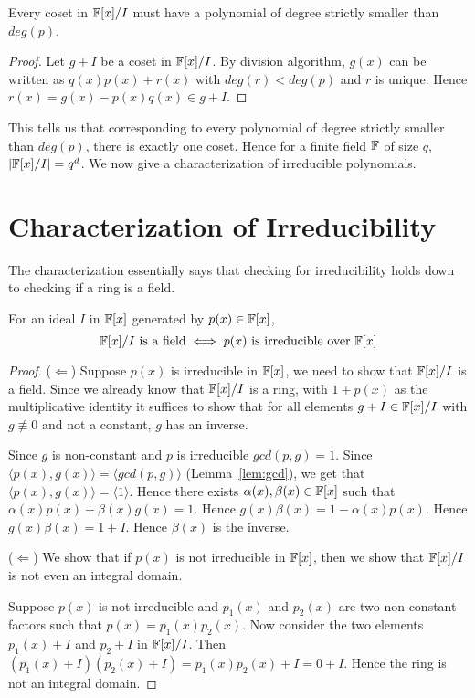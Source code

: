 \begin{observation}
	Every coset in ${\mathbb{F}}[x]/I$ must have a polynomial of degree strictly
	smaller than $deg(p)$.
\end{observation}
\begin{proof}
	Let $g + I$ be a coset in ${\mathbb{F}}[x]/I$. By division algorithm, $g(x)$ can
	be written as $q(x)p(x) + r(x)$ with $deg(r) < deg(p)$ and $r$ is
	unique. Hence $r(x) = g(x) - p(x)q(x) \in g +I$.
\end{proof}

This tells us that corresponding to every polynomial of degree strictly
smaller than $deg(p)$, there is exactly one coset. Hence for a finite field
${\mathbb{F}}$ of size $q$, $|{\mathbb{F}}[x]/I| = q^d$.  We now give a characterization of
irreducible polynomials.  
\section{Characterization of Irreducibility}
The characterization essentially says that checking for irreducibility holds
down to checking if a ring is a field.
\begin{theorem}
	For an ideal $I$ in ${\mathbb{F}}[x]$ generated by $p(x) \in {\mathbb{F}}[x]$, 
	\[ {\mathbb{F}}[x]/I \text{ is a field} \iff p(x) \text{ is irreducible over }
	{\mathbb{F}}[x] \]
\end{theorem}
\begin{proof}
	($\Longleftarrow$) Suppose $p(x)$ is irreducible in ${\mathbb{F}}[x]$, we need
	to show that ${\mathbb{F}}[x]/I$ is a field. Since we already know that
	${\mathbb{F}}[x]/I$ is a ring, with $1+p(x)$ as the multiplicative identity it
	suffices to show that for all elements $g + I \in {\mathbb{F}}[x]/I$ with $g
	\not \equiv 0$ and not a constant, $g$ has an inverse. 

	Since $g$ is non-constant and $p$ is irreducible $gcd(p,g) = 1$. Since
	$\langle p(x), g(x) \rangle = \langle gcd(p,g) \rangle$
	(Lemma~\ref{lem:gcd}), we get that $\langle p(x) ,g(x) \rangle =
	\langle 1 \rangle$. Hence there exists $\alpha(x), \beta(x) \in {\mathbb{F}}[x]$
	such that $\alpha(x)p(x) + \beta(x)g(x) = 1$. Hence $g(x)\beta(x) = 1
	- \alpha(x)p(x)$. Hence $g(x) \beta(x) = 1 + I$. Hence $\beta(x)$ is
	the inverse.

	($\Longleftarrow$) We show that if $p(x)$ is not irreducible in
	${\mathbb{F}}[x]$, then we show that ${\mathbb{F}}[x]/I$ is not even an integral domain. 

	Suppose $p(x)$ is not irreducible and $p_1(x)$ and $p_2(x)$ are two
	non-constant factors such that $p(x) = p_1(x)p_2(x)$. Now
	consider the two elements $p_1(x) + I$ and $p_2 + I$ in ${\mathbb{F}}[x]/I$.
	Then $(p_1(x) + I) (p_2(x) + I) = p_1(x)p_2(x) + I = 0 + I$. Hence the
	ring is not an integral domain.
\end{proof}



